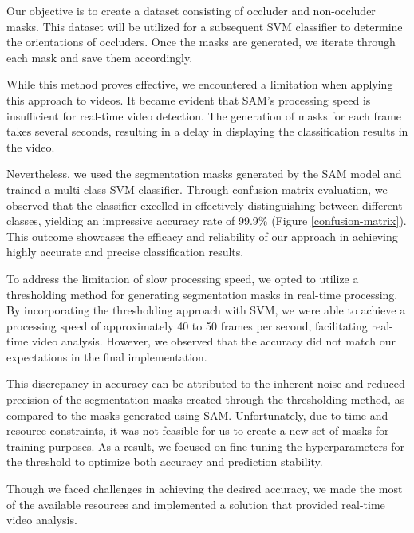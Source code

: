 \documentclass{article}
\begin{document}
Our objective is to create a dataset consisting of occluder and non-occluder masks. This dataset will be utilized for a subsequent SVM classifier to determine the orientations of occluders. Once the masks are generated, we iterate through each mask and save them accordingly.

While this method proves effective, we encountered a limitation when applying this approach to videos. It became evident that SAM's processing speed is insufficient for real-time video detection. The generation of masks for each frame takes several seconds, resulting in a delay in displaying the classification results in the video.

Nevertheless, we used the segmentation masks generated by the SAM model and trained a multi-class SVM classifier. Through confusion matrix evaluation, we observed that the classifier excelled in effectively distinguishing between different classes, yielding an impressive accuracy rate of 99.9\% (Figure \ref{confusion-matrix}). This outcome showcases the efficacy and reliability of our approach in achieving highly accurate and precise classification results.

To address the limitation of slow processing speed, we opted to utilize a thresholding method for generating segmentation masks in real-time processing. By incorporating the thresholding approach with SVM, we were able to achieve a processing speed of approximately 40 to 50 frames per second, facilitating real-time video analysis. However, we observed that the accuracy did not match our expectations in the final implementation.

This discrepancy in accuracy can be attributed to the inherent noise and reduced precision of the segmentation masks created through the thresholding method, as compared to the masks generated using SAM. Unfortunately, due to time and resource constraints, it was not feasible for us to create a new set of masks for training purposes. As a result, we focused on fine-tuning the hyperparameters for the threshold to optimize both accuracy and prediction stability.

Though we faced challenges in achieving the desired accuracy, we made the most of the available resources and implemented a solution that provided real-time video analysis.
\end{document}
